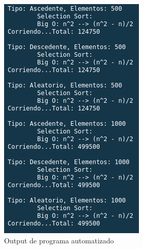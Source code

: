 \documentclass{article}
\begin{document}
\begin{figure}[H]
\begin{multicols}{2}
					\includegraphics[width = \linewidth]{images/e3-2}\par
				\end{multicols}
			\caption{Output de programa automatizado}
			\end{figure}	
		
\end{document}
